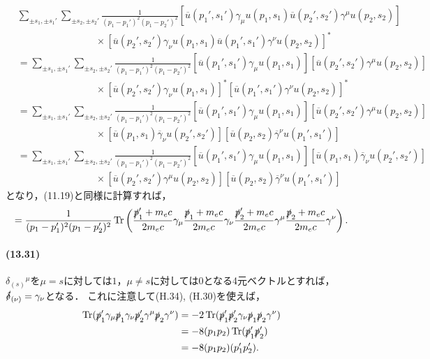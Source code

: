 \begin{align*}
  & \sum_{\pm s_1, \pm s_1'} \sum_{\pm s_2, \pm s_2'} \frac{1}{(p_1-p_1')^2(p_1-p_2')^2} \left[ \overline{u}(p_1',s_1') \gamma_\mu u(p_1, s_1) \overline{u}(p_2',s_2') \gamma^\mu u(p_2, s_2) \right] \\
  &\qquad\qquad\qquad\qquad \times \left[ \overline{u}(p_2',s_2') \gamma_\nu u(p_1, s_1) \overline{u}(p_1',s_1') \gamma^\nu u(p_2, s_2) \right]^* \\
  & = \sum_{\pm s_1, \pm s_1'} \sum_{\pm s_2, \pm s_2'} \frac{1}{(p_1-p_1')^2(p_1-p_2')^2} \left[ \overline{u}(p_1',s_1') \gamma_\mu u(p_1, s_1) \right] \left[ \overline{u}(p_2',s_2') \gamma^\mu u(p_2, s_2) \right]\\
  &\qquad\qquad\qquad\qquad \times \left[ \overline{u}(p_2',s_2') \gamma_\nu u(p_1, s_1) \right]^* \left[ \overline{u}(p_1',s_1') \gamma^\nu u(p_2, s_2) \right]^* \\
  & = \sum_{\pm s_1, \pm s_1'} \sum_{\pm s_2, \pm s_2'} \frac{1}{(p_1-p_1')^2(p_1-p_2')^2} \left[ \overline{u}(p_1',s_1') \gamma_\mu u(p_1, s_1) \right] \left[ \overline{u}(p_2',s_2') \gamma^\mu u(p_2, s_2) \right] \\
  & \qquad\qquad\qquad\qquad \times \left[ \overline{u}(p_1,s_1) \overline{\gamma}_\nu u(p_2', s_2') \right] \left[ \overline{u}(p_2, s_2) \overline{\gamma}^\nu u(p_1', s_1') \right] \\
  & = \sum_{\pm s_1, \pm s_1'} \sum_{\pm s_2, \pm s_2'} \frac{1}{(p_1-p_1')^2(p_1-p_2')^2} \left[ \overline{u}(p_1',s_1') \gamma_\mu u(p_1, s_1) \right] \left[ \overline{u}(p_1,s_1) \overline{\gamma}_\nu u(p_2', s_2') \right] \\
  & \qquad\qquad\qquad\qquad \times \left[ \overline{u}(p_2',s_2') \gamma^\mu u(p_2, s_2) \right]  \left[ \overline{u}(p_2, s_2) \overline{\gamma}^\nu u(p_1', s_1') \right]
\end{align*}
となり，(11.19)と同様に計算すれば，
\[=\frac{1}{(p_1-p_1')^2(p_1-p_2')^2}\operatorname{Tr} \left( \frac{\slashed{p}_1'+m_ec}{2m_ec} \gamma_\mu \frac{\slashed{p}_1+m_ec}{2m_ec} \gamma_\nu  \frac{\slashed{p}_2'+m_ec}{2m_ec} \gamma^\mu \frac{\slashed{p}_2+m_ec}{2m_ec} \gamma^\nu \right). \]

\paragraph{(13.31)}
$\delta_{(s)}{}^\mu$を$\mu=s$に対しては$1$，$\mu\neq s$に対しては$0$となる4元ベクトルとすれば，$\slashed{\delta}_{(\nu)}=\gamma_\nu$となる．
これに注意して(H.34), (H.30)を使えば，
\begin{align*}
  \operatorname{Tr} (\slashed{p}_1' \gamma_\mu \slashed{p}_1 \gamma_\nu \slashed{p}_2' \gamma^\mu \slashed{p}_2 \gamma^\nu) & = -2\operatorname{Tr} (\slashed{p}_1' \slashed{p}_2' \gamma_\nu \slashed{p}_1 \slashed{p}_2 \gamma^\nu) \\
  & = -8(p_1p_2)\operatorname{Tr} (\slashed{p}_1' \slashed{p}_2' ) \\
  & = -8(p_1p_2)(p_1'p_2').
\end{align*}

